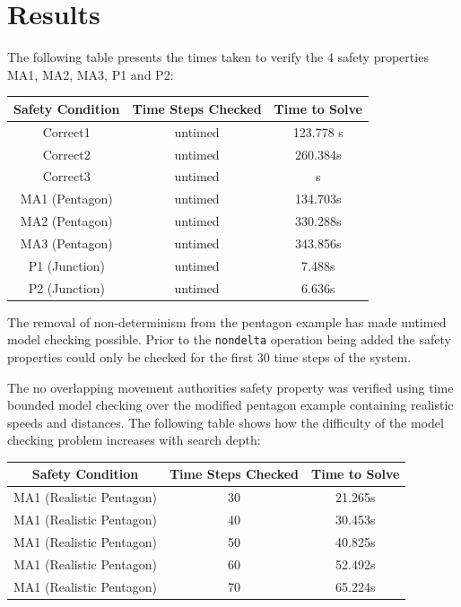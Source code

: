 \section{Results}
The following table presents the times taken to verify the 4 safety properties MA1, MA2, MA3, P1 and P2:
\begin{center}
\begin{tabular}{c | c | c} 
Safety Condition & Time Steps Checked & Time to Solve  \\ \hline
Correct1 & untimed & 123.778 s\\
Correct2 & untimed & 260.384s\\
Correct3 & untimed & s\\
MA1 (Pentagon)& untimed &134.703s  \\
MA2 (Pentagon)& untimed &330.288s \\ 
MA3 (Pentagon)&  untimed &343.856s \\
P1 (Junction)& untimed &7.488s \\
P2 (Junction)& untimed & 6.636s \\
\end{tabular}
\end{center}

The removal of non-determinism from the pentagon example has made untimed model checking possible. Prior to the \texttt{nondelta} operation being added the safety properties could only be checked for the first 30 time steps of the system.

The no overlapping movement authorities safety property was verified using time bounded model checking over the modified pentagon example containing realistic speeds and distances. The following table shows how the difficulty of the model checking problem increases with search depth:

\begin{center}
\begin{tabular}{c | c | c} 
Safety Condition & Time Steps Checked & Time to Solve  \\ \hline
MA1 (Realistic Pentagon) & 30 & 21.265s \\
MA1 (Realistic Pentagon) & 40 & 30.453s \\
MA1 (Realistic Pentagon) & 50 & 40.825s \\
MA1 (Realistic Pentagon) & 60 & 52.492s \\
MA1 (Realistic Pentagon) & 70 & 65.224s \\
\end{tabular}
\end{center}

